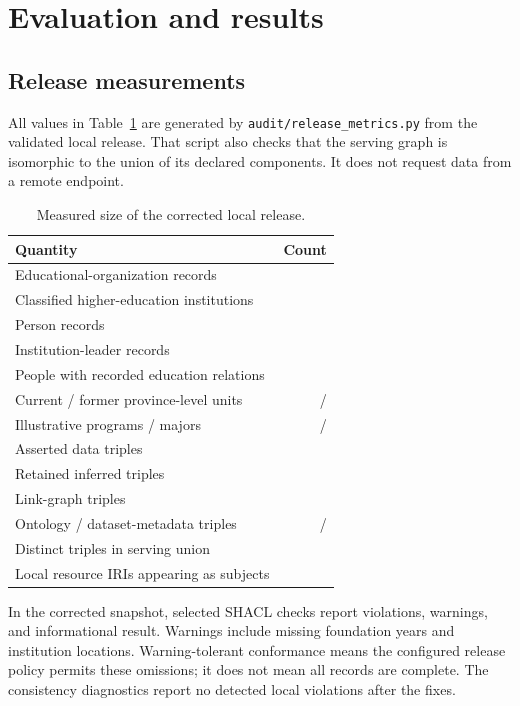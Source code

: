 \documentclass[11pt,a4paper]{article}
\newcommand{\term}[1]{\texttt{#1}}
\begin{document}


\section{Evaluation and results}
\subsection{Release measurements}
All values in Table~\ref{tab:size} are generated by \term{audit/release\_metrics.py} from
the validated local release. That script also checks that the serving graph is isomorphic
to the union of its declared components. It does not request data from a remote endpoint.
\begin{table}[htbp]\centering
\caption{Measured size of the corrected local release.}\label{tab:size}
\begin{tabularx}{\textwidth}{Xr}\toprule
Quantity & Count \\\midrule
Educational-organization records & \metricInstitutions{} \\
Classified higher-education institutions & \metricHEIs{} \\
Person records & \metricPeople{} \\
Institution-leader records & \metricLeaders{} \\
People with recorded education relations & \metricEducationParticipants{} \\
Current / former province-level units & \metricCurrentProvinces{} / \metricFormerProvinces{} \\
Illustrative programs / majors & \metricPrograms{} / \metricMajors{} \\
Asserted data triples & \metricAssertedTriples{} \\
Retained inferred triples & \metricInferredTriples{} \\
Link-graph triples & \metricLinkTriples{} \\
Ontology / dataset-metadata triples & \metricOntologyTriples{} / \metricMetadataTriples{} \\
Distinct triples in serving union & \metricUnionTriples{} \\
Local resource IRIs appearing as subjects & \metricLocalResources{} \\
\bottomrule\end{tabularx}
\end{table}

In the corrected snapshot, selected SHACL checks report \metricViolations{} violations,
\metricWarnings{} warnings, and \metricInformationResults{} informational result.
Warnings include missing foundation years and institution locations. Warning-tolerant
conformance means the configured release policy permits these omissions; it does not
mean all records are complete. The consistency diagnostics report no detected local
violations after the fixes.
\end{document}
